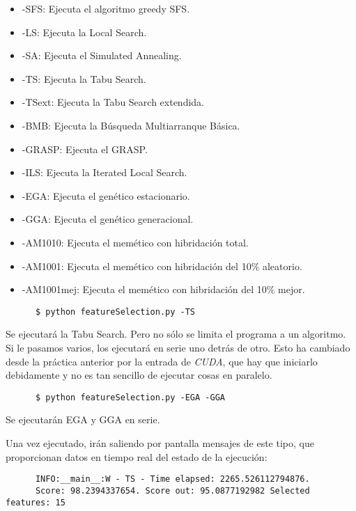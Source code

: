 \documentclass[a4paper, 11pt]{article}
\begin{document}
    \begin{itemize}
      \item -SFS: Ejecuta el algoritmo greedy SFS.
      \item -LS: Ejecuta la Local Search.
      \item -SA: Ejecuta el Simulated Annealing.
      \item -TS: Ejecuta la Tabu Search.
      \item -TSext: Ejecuta la Tabu Search extendida.
      \item -BMB: Ejecuta la Búsqueda Multiarranque Básica.
      \item -GRASP: Ejecuta el GRASP.
      \item -ILS: Ejecuta la Iterated Local Search.
      \item -EGA: Ejecuta el genético estacionario.
      \item -GGA: Ejecuta el genético generacional.
      \item -AM1010: Ejecuta el memético con hibridación total.
      \item -AM1001: Ejecuta el memético con hibridación del 10\% aleatorio.
      \item -AM1001mej: Ejecuta el memético con hibridación del 10\% mejor.
    \end{itemize}

    \begin{verbatim}
      $ python featureSelection.py -TS
    \end{verbatim}
    Se ejecutará la Tabu Search. Pero no sólo se limita el programa a un algoritmo. Si le pasamos varios, los ejecutará en serie uno detrás de otro. Esto ha cambiado desde la práctica anterior por la entrada de \emph{CUDA}, que hay que iniciarlo debidamente y no es tan sencillo de ejecutar cosas en paralelo.

    \begin{verbatim}
      $ python featureSelection.py -EGA -GGA
    \end{verbatim}
    Se ejecutarán EGA y GGA en serie.

    Una vez ejecutado, irán saliendo por pantalla mensajes de este tipo, que proporcionan datos en tiempo real del estado de la ejecución:

    \begin{verbatim}
      INFO:__main__:W - TS - Time elapsed: 2265.526112794876.
      Score: 98.2394337654. Score out: 95.0877192982 Selected features: 15
    \end{verbatim}
\end{document}
